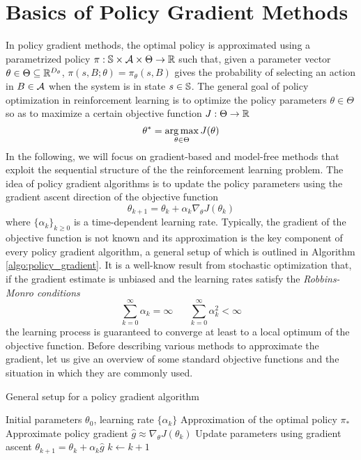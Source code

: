\section{Basics of Policy Gradient Methods}
In policy gradient methods, the optimal policy is approximated using a parametrized 
policy $\pi: \S \times \calA \times \Theta \to \R$ such that, given a parameter vector $\theta \in \Theta \subseteq \R^{D_\theta}$, $\pi(s, B; \theta) = \pi_\theta(s, B)$ gives the probability of selecting an action in $B \in \calA$ when the system is in state $s \in \S$.
The general goal of policy optimization in reinforcement learning is to
optimize the policy parameters $\theta \in \Theta$ so as to maximize a certain
objective function $J: \Theta \to \R$
\begin{equation*}
	\theta^* = \argmax_{\theta \in \Theta} J(\theta)
\end{equation*}
In the following, we will focus on gradient-based and model-free methods that exploit
the sequential structure of the the reinforcement learning problem. The idea of
policy gradient algorithms is to update the policy parameters using the gradient ascent direction of the objective function
\begin{equation}
	\theta_{k+1} = \theta_k + \alpha_k \nabla_\theta J\left(\theta_k\right)
\end{equation}
where $\{\alpha_k\}_{k\geq 0}$ is a time-dependent learning rate. Typically, the gradient of the objective function is not known and its approximation is the key component of every policy gradient algorithm, a general setup of which is outlined in Algorithm \ref{algo:policy_gradient}. It is a well-know result from stochastic optimization \cite{kushner2003stochastic} that, if the gradient estimate is unbiased and the learning rates satisfy the \emph{Robbins-Monro conditions}
\begin{equation}
	\sum_{k=0}^\infty \alpha_k = \infty \;\;\;\;\;\; \sum^{\infty}_{k=0}
	\alpha_k^2 < \infty 
\end{equation}
the learning process is guaranteed to converge at least to a local optimum of
the objective function. Before describing various methods to approximate the gradient, let us give an overview of some standard objective functions and the situation in which they are commonly used. 

\begin{algorithm}[t]
	\caption{General setup for a policy gradient algorithm}
	\label{algo:policy_gradient}
	\begin{algorithmic}[1]
		\Require Initial parameters $\theta_0$, learning rate $\{\alpha_k\}$
		\Ensure Approximation of the optimal policy $\pi_*$
		\Repeat
			\State Approximate policy gradient $\widehat{g} \approx \nabla_\theta J\left(\theta_k\right)$
			\State Update parameters using gradient ascent $\theta_{k+1} = \theta_k + \alpha_k \widehat{g}$
			\State $k \leftarrow k + 1$
	\end{algorithmic}
\end{algorithm}

